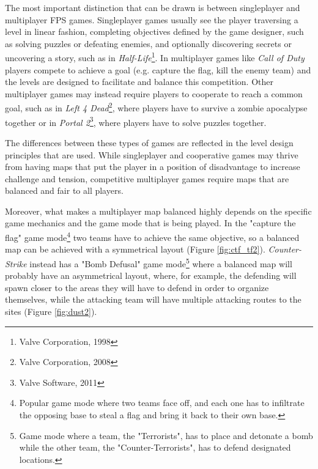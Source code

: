 \documentclass{Configuration_Files/PoliMi3i_thesis}
\begin{document}
The most important distinction that can be drawn is between singleplayer and multiplayer FPS games. Singleplayer games usually see the player traversing a level in linear fashion, completing objectives defined by the game designer, such as solving puzzles or defeating enemies, and optionally discovering secrets or uncovering a story, such as in \textit{Half-Life}\footnote{Valve Corporation, 1998}. In multiplayer games like \textit{Call of Duty} players compete to achieve a goal (e.g. capture the flag, kill the enemy team) and the levels are designed to facilitate and balance this competition. Other multiplayer games may instead require players to cooperate to reach a common goal, such as in \textit{Left 4 Dead}\footnote{Valve Corporation, 2008}, where players have to survive a zombie apocalypse together or in \textit{Portal 2}\footnote{Valve Software, 2011}, where players have to solve puzzles together.

The differences between these types of games are reflected in the level design principles that are used. While singleplayer and cooperative games may thrive from having maps that put the player in a position of disadvantage to increase challenge and tension, competitive multiplayer games require maps that are balanced and fair to all players. 

Moreover, what makes a multiplayer map balanced highly depends on the specific game mechanics and the game mode that is being played. In the "capture the flag" game mode\footnote{Popular game mode where two teams face off, and each one has to infiltrate the opposing base to steal a flag and bring it back to their own base.} two teams have to achieve the same objective, so a balanced map can be achieved with a symmetrical layout (Figure \ref{fig:ctf_tf2}). \textit{Counter-Strike} instead has a "Bomb Defusal" game mode\footnote{Game mode where a team, the "Terrorists", has to place and detonate a bomb while the other team, the "Counter-Terrorists", has to defend designated locations.} where a balanced map will probably have an asymmetrical layout, where, for example, the defending will spawn closer to the areas they will have to defend in order to organize themselves, while the attacking team will have multiple attacking routes to the sites (Figure \ref{fig:dust2}).
\end{document}
